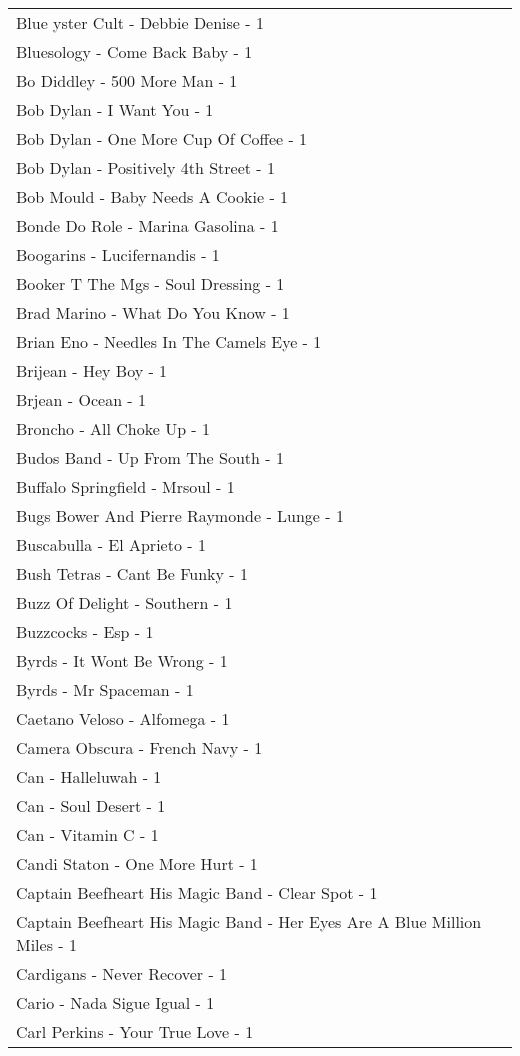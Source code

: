 \documentclass[
]{article}
\begin{document}
\begin{longtable}{l}
Blue yster Cult - Debbie Denise - 1 \\ 
Bluesology - Come Back Baby - 1 \\ 
Bo Diddley - 500 More Man - 1 \\ 
Bob Dylan - I Want You - 1 \\ 
Bob Dylan - One More Cup Of Coffee - 1 \\ 
Bob Dylan - Positively 4th Street - 1 \\ 
Bob Mould - Baby Needs A Cookie - 1 \\ 
Bonde Do Role - Marina Gasolina - 1 \\ 
Boogarins - Lucifernandis - 1 \\ 
Booker T The Mgs - Soul Dressing - 1 \\ 
Brad Marino - What Do You Know - 1 \\ 
Brian Eno - Needles In The Camels Eye - 1 \\ 
Brijean - Hey Boy - 1 \\ 
Brjean - Ocean - 1 \\ 
Broncho - All Choke Up - 1 \\ 
Budos Band - Up From The South - 1 \\ 
Buffalo Springfield - Mrsoul - 1 \\ 
Bugs Bower And Pierre Raymonde - Lunge - 1 \\ 
Buscabulla - El Aprieto - 1 \\ 
Bush Tetras - Cant Be Funky - 1 \\ 
Buzz Of Delight - Southern - 1 \\ 
Buzzcocks - Esp - 1 \\ 
Byrds - It Wont Be Wrong - 1 \\ 
Byrds - Mr Spaceman - 1 \\ 
Caetano Veloso - Alfomega - 1 \\ 
Camera Obscura - French Navy - 1 \\ 
Can - Halleluwah - 1 \\ 
Can - Soul Desert - 1 \\ 
Can - Vitamin C - 1 \\ 
Candi Staton - One More Hurt - 1 \\ 
Captain Beefheart His Magic Band - Clear Spot - 1 \\ 
Captain Beefheart His Magic Band - Her Eyes Are A Blue Million Miles - 1 \\ 
Cardigans - Never Recover - 1 \\ 
Cario - Nada Sigue Igual - 1 \\ 
Carl Perkins - Your True Love - 1 \\ 

\end{longtable}
\end{document}
